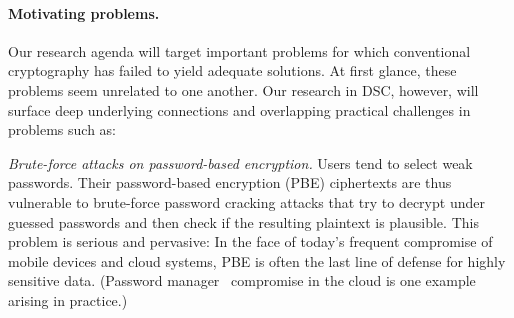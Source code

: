 {{\paragraph{Motivating problems.}  
Our research agenda will target important problems
for which conventional cryptography has failed to yield adequate solutions.
At first glance, these problems seem unrelated to one another. 
Our research in DSC, however, will surface deep underlying connections and overlapping practical challenges in problems such as:
  

\begin{newitemize} 

\item{\em Brute-force attacks on password-based encryption.} Users tend to select weak
passwords. Their password-based encryption (PBE) ciphertexts are thus vulnerable
to brute-force password cracking attacks that try to decrypt under guessed passwords and
then check if the resulting plaintext is plausible.  This problem is serious and
pervasive: In the face of today's frequent compromise of
mobile devices and cloud systems, PBE is often the last line of defense for
highly sensitive data.  (Password manager~\cite{whitney11} compromise in the cloud is one example arising in practice.)
%


\end{newitemize}}}
